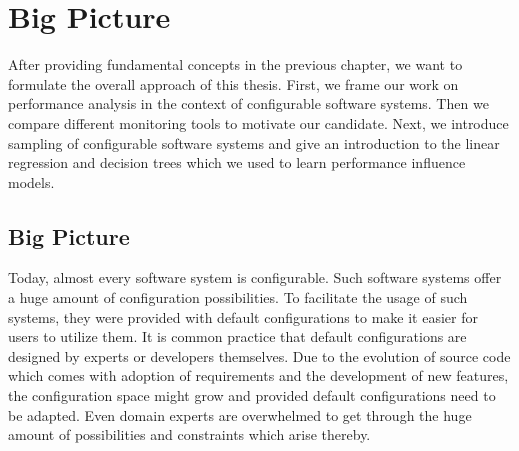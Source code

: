 \chapter{Big Picture}
\label{chap:method}

After providing fundamental concepts in the previous chapter, we want to formulate the overall approach of this thesis. First, we frame our work on performance analysis in the context of configurable software systems. Then we compare different monitoring tools to motivate our candidate. Next, we introduce sampling of configurable software systems and give an introduction to the linear regression and decision trees which we used to learn performance influence models.

\section{Big Picture}



Today, almost every software system is configurable. Such software systems offer a huge amount of configuration possibilities. To facilitate the usage of such systems, they were provided with default configurations to make it easier for users to utilize them. It is common practice that default configurations are designed by experts or developers themselves. Due to the evolution of source code which comes with adoption of requirements and the development of new features, the configuration space might grow and provided default configurations need to be adapted. Even domain experts are overwhelmed to get through the huge amount of possibilities and constraints which arise thereby.

